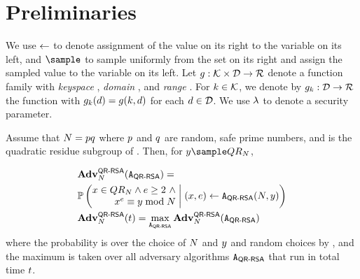 \section{Preliminaries}
\label{sec:def}
%


%
We use $\gets$ to denote assignment of the value on its right to
the variable on its left, and $\sample$ to sample uniformly from the
set on its right and assign the sampled value to the variable on its
left.  Let $\genericFnFamily: \genericFnKeyspace \times
\genericFnDomain \rightarrow \genericFnRange$ denote a function family
with \textit{keyspace} \genericFnKeyspace, \textit{domain}
\genericFnDomain, and \textit{range} \genericFnRange.  For
$\genericFnKey \in \genericFnKeyspace$, we denote by
$\genericFnFamily[\genericFnKey]: \genericFnDomain \rightarrow
\genericFnRange$ the function with
$\genericFnFamily[\genericFnKey](\genericFnDomainElmt) =
\genericFnFamily(\genericFnKey, \genericFnDomainElmt)$ for each
$\genericFnDomainElmt \in \genericFnDomain$. We use $\lambda$ to 
denote a security parameter. 



\begin{definition}
	Assume that $\rsaMod = \safePrime[1] \safePrime[2]$ where
        $\safePrime[1]$ and $\safePrime[2]$ are random, safe prime
        numbers, and \qrGroup is the quadratic residue subgroup of
        \integersModNInv. Then, for $\genericFnOutput \getsr
        \qrGroup$,
	
	\begin{align*}
	  & \Advantage{\rsaLabel}{\rsaMod}(\rsaAdversary) = \\
          & \cprob{\bigg}{\begin{array}{@{}r@{}}
              \genericFnInput \in \qrGroup \land
              \rsaExponent \ge 2~\land \\
              \genericFnInput^{\rsaExponent} \equiv \genericFnOutput 
	      \bmod \rsaMod
          \end{array}}{\begin{array}[m]{@{}l@{}}
              (\genericFnInput, \rsaExponent)
              \gets \rsaAdversary(\rsaMod, \genericFnOutput)
          \end{array}} \\
	  & \rsaAdv = \max_{\rsaAdversary} 
	 \Advantage{\rsaLabel}{\rsaMod}(\rsaAdversary) 
	\end{align*}
	\noindent
	where the probability is over the choice of $N$ and
        $\genericFnOutput$ and random choices by \rsaAdversary, and
        the maximum is taken over all adversary algorithms
        $\rsaAdversary$ that run in total time $t$.
	\end{definition}


